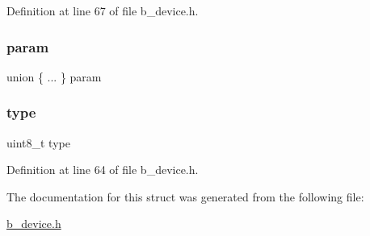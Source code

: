 Definition at line 67 of file b\+\_\+device.\+h.

\mbox{\label{structb_c_m_d___struct__t_a7ce465aa898864961d9fcfd902cc61fc}} 
\subsubsection{\texorpdfstring{param}{param}}
{\footnotesize\ttfamily union \{ ... \}  param}

\mbox{\label{structb_c_m_d___struct__t_a1d127017fb298b889f4ba24752d08b8e}} 
\subsubsection{\texorpdfstring{type}{type}}
{\footnotesize\ttfamily uint8\+\_\+t type}



Definition at line 64 of file b\+\_\+device.\+h.



The documentation for this struct was generated from the following file\+:\begin{DoxyCompactItemize}
\item 
\mbox{\hyperlink{b__device_8h}{b\+\_\+device.\+h}}\end{DoxyCompactItemize}
